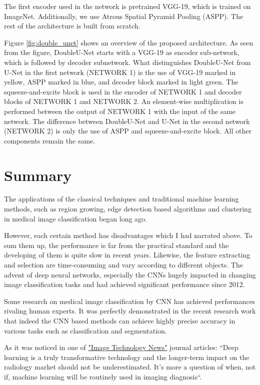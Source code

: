 The first encoder used in the network is pretrained VGG-19, which is trained on ImageNet. Additionally, we use Atrous Spatial Pyramid Pooling (ASPP). The rest of the architecture is built from scratch. 

Figure \ref{fig:double_unet} shows an overview of the proposed architecture. As seen from the figure, DoubleU-Net starts with a VGG-19 as encoder sub-network, which is followed by decoder subnetwork. What distinguishes DoubleU-Net from U-Net in the
first network (NETWORK 1) is the use of VGG-19 marked in yellow, ASPP marked in blue, and decoder block marked in light green. The squeeze-and-excite block is used in the encoder of NETWORK 1 and decoder blocks of NETWORK 1 and NETWORK 2. An element-wise multiplication is performed between the output of NETWORK 1 with the input of the same network. The difference between DoubleU-Net and U-Net in the second network (NETWORK 2) is only the use of ASPP and squeeze-and-excite block. All other components remain the same.


\section{Summary}
The applications of the classical techniques and traditional machine learning methods, such as region growing, edge detection based algorithms and clustering in medical image classification began long ago. 

However, each certain method has disadvantages which I had narrated above. To sum them up, the performance is far from the practical standard and the developing of them is quite slow in recent years. Likewise, the feature extracting and selection are time-consuming and vary according to different objects. The advent of deep neural networks, especially the CNNs hugely impacted in changing image classification tasks and had achieved significant performance since 2012.

Some research on medical image classification by CNN has achieved performances rivaling human experts. It was perfectly demonstrated in the recent research work \cite{Anwar2018} that indeed the CNN based methods can achieve highly precise accuracy in various tasks such as classification and segmentation. 

As it was noticed in one of  \href{https://www.itnonline.com/content/deep-learning-medical-imaging-create-300-million-market-2021}{"Image Technology News"} journal articles: ``Deep learning is a truly transformative technology and the longer-term impact on the radiology market should not be underestimated. It’s more a question of when, not if, machine learning will be routinely used in imaging diagnosis``. 


